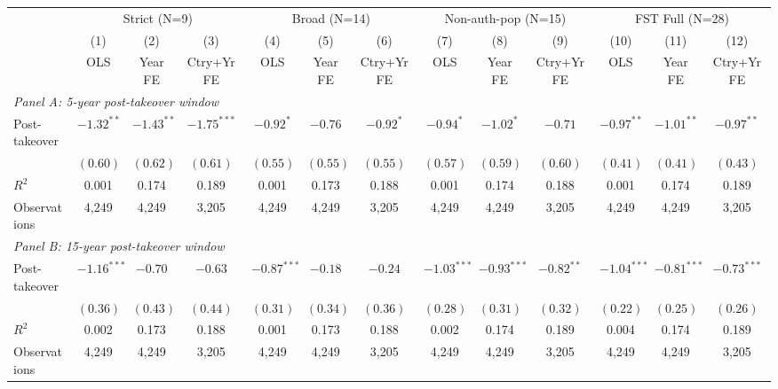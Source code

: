 \begin{adjustbox}{max width=\textwidth}
\begin{tabular}{l*{12}{c}}
\toprule
 & \multicolumn{3}{c}{Strict (N=9)} & \multicolumn{3}{c}{Broad (N=14)} & \multicolumn{3}{c}{Non-auth-pop (N=15)} & \multicolumn{3}{c}{FST Full (N=28)} \\
\cmidrule(lr){2-4}\cmidrule(lr){5-7}\cmidrule(lr){8-10}\cmidrule(lr){11-13}
 & (1) & (2) & (3) & (4) & (5) & (6) & (7) & (8) & (9) & (10) & (11) & (12) \\
 & OLS & Year FE & Ctry+Yr FE & OLS & Year FE & Ctry+Yr FE & OLS & Year FE & Ctry+Yr FE & OLS & Year FE & Ctry+Yr FE \\
\midrule
\multicolumn{13}{l}{\textit{Panel A: 5-year post-takeover window}} \\[3pt]
Post-takeover & $-1.32^{**}$ & $-1.43^{**}$ & $-1.75^{***}$ & $-0.92^{*}$ & $-0.76$ & $-0.92^{*}$ & $-0.94^{*}$ & $-1.02^{*}$ & $-0.71$ & $-0.97^{**}$ & $-1.01^{**}$ & $-0.97^{**}$ \\
 & $(0.60)$ & $(0.62)$ & $(0.61)$ & $(0.55)$ & $(0.55)$ & $(0.55)$ & $(0.57)$ & $(0.59)$ & $(0.60)$ & $(0.41)$ & $(0.41)$ & $(0.43)$ \\[4pt]
$R^{2}$ & 0.001 & 0.174 & 0.189 & 0.001 & 0.173 & 0.188 & 0.001 & 0.174 & 0.188 & 0.001 & 0.174 & 0.189 \\
Observations & 4,249 & 4,249 & 3,205 & 4,249 & 4,249 & 3,205 & 4,249 & 4,249 & 3,205 & 4,249 & 4,249 & 3,205 \\
\midrule
\multicolumn{13}{l}{\textit{Panel B: 15-year post-takeover window}} \\[3pt]
Post-takeover & $-1.16^{***}$ & $-0.70$ & $-0.63$ & $-0.87^{***}$ & $-0.18$ & $-0.24$ & $-1.03^{***}$ & $-0.93^{***}$ & $-0.82^{**}$ & $-1.04^{***}$ & $-0.81^{***}$ & $-0.73^{***}$ \\
 & $(0.36)$ & $(0.43)$ & $(0.44)$ & $(0.31)$ & $(0.34)$ & $(0.36)$ & $(0.28)$ & $(0.31)$ & $(0.32)$ & $(0.22)$ & $(0.25)$ & $(0.26)$ \\[4pt]
$R^{2}$ & 0.002 & 0.173 & 0.188 & 0.001 & 0.173 & 0.188 & 0.002 & 0.174 & 0.189 & 0.004 & 0.174 & 0.189 \\
Observations & 4,249 & 4,249 & 3,205 & 4,249 & 4,249 & 3,205 & 4,249 & 4,249 & 3,205 & 4,249 & 4,249 & 3,205 \\
\bottomrule
\end{tabular}
\end{adjustbox}
